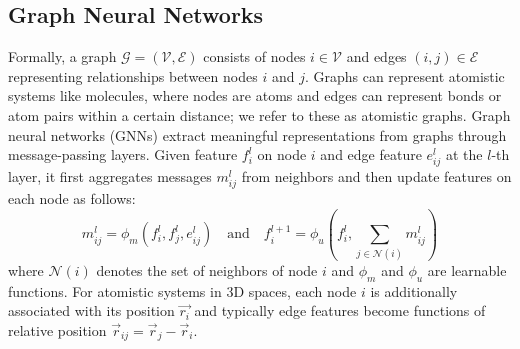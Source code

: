 \vspace{-1mm}
\subsection{Graph Neural Networks}
\vspace{-1mm}

Formally, a graph $\mathcal{G} = (\mathcal{V}, \mathcal{E})$ consists of nodes $i \in \mathcal{V}$ and edges $(i, j) \in \mathcal{E}$ representing relationships between nodes $i$ and $j$. 
Graphs can represent atomistic systems like molecules, where nodes are atoms and edges can represent bonds or atom pairs within a certain distance; we refer to these as atomistic graphs. %
Graph neural networks (GNNs)  extract meaningful representations from graphs through message-passing layers.
Given feature $f_i^{l}$ on node $i$ and edge feature $e_{ij} ^ l$ at the $l$-th layer, it first aggregates messages $m_{ij}^l$ from neighbors and then update features on each node as follows:
\begin{equation}
m_{ij}^l = \phi_{m}(f_i^{l}, f_j^{l}, e_{ij}^{l}) 
\quad\text{and}\quad
f_{i}^{l+1} = \phi_{u}(f_{i}^{l}, \sum_{j \in \mathcal{N}(i)} m_{ij}^{l} )
\end{equation}
where $\mathcal{N}(i)$ denotes the set of neighbors of node $i$ and $\phi_m$ and $\phi_u$ are learnable functions.
For atomistic systems in 3D spaces, each node $i$ is additionally associated with its position $\vec{r_i}$ and typically edge features become functions of relative position $\vec{r}_{ij} = \vec{r}_j - \vec{r}_i$.
